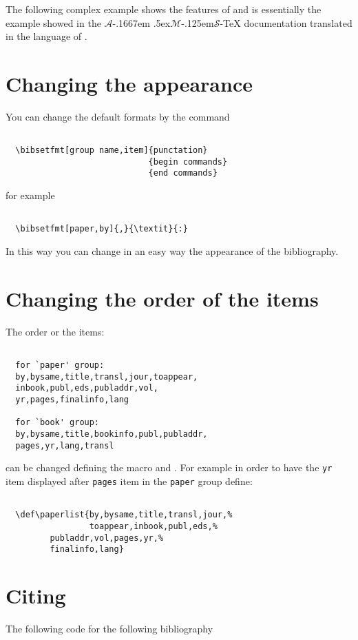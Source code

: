 \documentclass[a4paper]{article}
\newcommand{\AmSTeX}{{$\mathcal{A}$\kern-.1667em 
\lower.5ex\hbox{$\mathcal{M}$}\kern-.125em$\mathcal{S}$}-\TeX}
\begin{document}
The following complex example shows the features of 
and is essentially the example showed in the \AmSTeX{} documentation
translated in the language of .
%
%
%


\section{Changing the appearance}
You can change the default formats by the command
\begin{verbatim}

  \bibsetfmt[group name,item]{punctation}
                             {begin commands}
                             {end commands}

\end{verbatim}
for example
\begin{verbatim}

  \bibsetfmt[paper,by]{,}{\textit}{:}

\end{verbatim}
%
In this way you can change in an easy way the appearance of the
bibliography.

\section{Changing the order of the items}
The order or the items:
\begin{verbatim}

  for `paper' group:
  by,bysame,title,transl,jour,toappear,
  inbook,publ,eds,publaddr,vol,
  yr,pages,finalinfo,lang
  
  for `book' group:
  by,bysame,title,bookinfo,publ,publaddr,
  pages,yr,lang,transl

\end{verbatim}
can be changed defining the macro  and
. For example in order to have the \verb'yr' item 
displayed after \verb'pages' item in the \verb'paper' group define:
\begin{verbatim}

  \def\paperlist{by,bysame,title,transl,jour,%
                 toappear,inbook,publ,eds,%
		 publaddr,vol,pages,yr,%
		 finalinfo,lang}

\end{verbatim}


\section{Citing}
%
The following code
%
%
for the following bibliography
%
\end{document}
